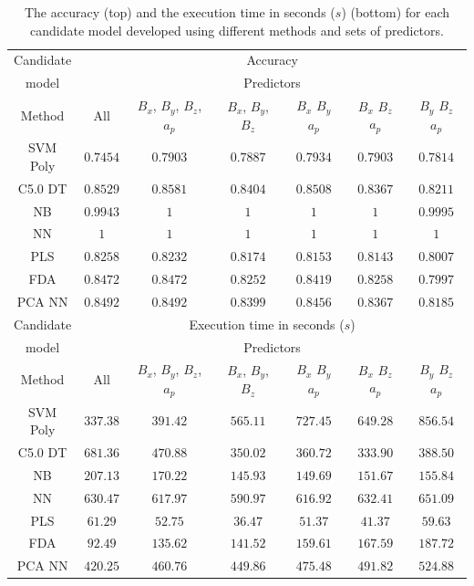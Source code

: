\let\LaTeXcline\cline\documentclass[sn-mathphys-num]{sn-jnl}\let\cline\LaTeXcline
\begin{document}
\begin{table}[!ht]
    \centering
    \caption{The accuracy (top) and the execution time in seconds ($s$) (bottom) for each candidate model developed using different methods and sets of predictors.}
	\label{tab:acc:time}
	\begin{tabular}{|c|c|c|c|c|c|c|}
		\hline
        Candidate & \multicolumn{6}{|c|}{Accuracy} \\ \cline{2-7}
        model & \multicolumn{6}{|c|}{Predictors} \\ \hline
		Method & All & $B_{x}$, $B_{y}$, $B_{z}$, $a_{p}$ & $B_{x}$, $B_{y}$, $B_{z}$ & $B_{x}$ $B_{y}$ $a_{p}$ & $B_{x}$ $B_{z}$ $a_{p}$ & $B_{y}$ $B_{z}$ $a_{p}$ \\ \hline
		SVM Poly & $0.7454$ & $0.7903$ & $0.7887$ & $0.7934$ & $0.7903$ & $0.7814$ \\ \hline
		C5.0 DT & $0.8529$ & $0.8581$ & $0.8404$ & $0.8508$ & $0.8367$ & $0.8211$ \\ \hline
		NB & $0.9943$ & $1$ & $1$ & $1$ & $1$ & $0.9995$ \\ \hline
		NN & $1$ & $1$ & $1$ & $1$ & $1$ & $1$ \\ \hline
		PLS & $0.8258$ & $0.8232$ & $0.8174$ & $0.8153$ & $0.8143$ & $0.8007$ \\ \hline
		FDA & $0.8472$ & $0.8472$ & $0.8252$ & $0.8419$ & $0.8258$ & $0.7997$ \\ \hline
		PCA NN & $0.8492$ & $0.8492$ & $0.8399$ & $0.8456$ & $0.8367$ & $0.8185$ \\ \hline
        Candidate & \multicolumn{6}{|c|}{Execution time in seconds ($s$)} \\ \cline{2-7}
        model & \multicolumn{6}{|c|}{Predictors} \\ \hline
		Method & All & $B_{x}$, $B_{y}$, $B_{z}$, $a_{p}$ & $B_{x}$, $B_{y}$, $B_{z}$ & $B_{x}$ $B_{y}$ $a_{p}$ & $B_{x}$ $B_{z}$ $a_{p}$ & $B_{y}$ $B_{z}$ $a_{p}$ \\ \hline
		SVM Poly & $337.38$ & $391.42$ & $565.11$ & $727.45$ & $649.28$ & $856.54$ \\ \hline
		C5.0 DT & $681.36$ & $470.88$ & $350.02$ & $360.72$ & $333.90$ & $388.50$ \\ \hline
		NB & $207.13$ & $170.22$ & $145.93$ & $149.69$ & $151.67$ & $155.84$ \\ \hline
		NN & $630.47$ & $617.97$ & $590.97$ & $616.92$ & $632.41$ & $651.09$ \\ \hline
		PLS & $61.29$ & $52.75$ & $36.47$ & $51.37$ & $41.37$ & $59.63$ \\ \hline
		FDA & $92.49$ & $135.62$ & $141.52$ & $159.61$ & $167.59$ & $187.72$ \\ \hline
		PCA NN & $420.25$ & $460.76$ & $449.86$ & $475.48$ & $491.82$ & $524.88$ \\ \hline
	\end{tabular}
\end{table}
\end{document}
